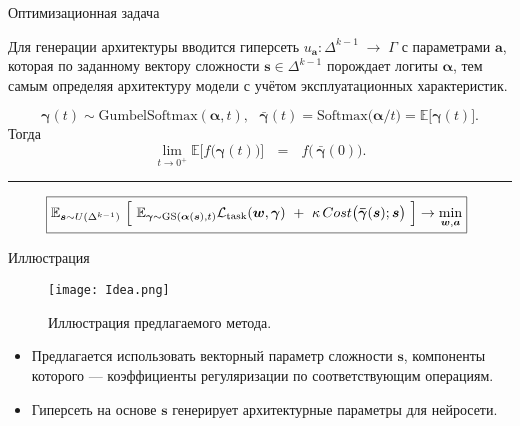 \documentclass{beamer}
\begin{document}

\begin{frame}{Оптимизационная задача}

Для генерации архитектуры вводится гиперсеть
$u_{\boldsymbol a}\colon \Delta^{k-1} \;\rightarrow\; \Gamma$  с параметрами $\boldsymbol a$, которая по заданному вектору сложности $\boldsymbol{s}\in\Delta^{k-1}$ порождает логиты
$\boldsymbol{\alpha}$, тем самым определяя архитектуру модели с учётом эксплуатационных характеристик.

\begin{theorem}[Фирсов, 2025] \label{th:gs_softmax}
\vspace{-20pt}
$$\boldsymbol\gamma(t)\sim\mathrm{GumbelSoftmax}(\boldsymbol\alpha,t),
   \ \ \ 
   \boldsymbol{\bar\gamma}(t)=\mathrm{Softmax}\!\bigl(\boldsymbol\alpha/t\bigr)
               =\mathbb E\bigl[\boldsymbol\gamma(t)\bigr].$$
Тогда
$$\lim_{t\to 0^{+}}
       \mathbb E\bigl[f\bigl(\boldsymbol\gamma(t)\bigr)\bigr]
   \ \ \ = \ \ \ 
   f\!\bigl(\,\boldsymbol{\bar\gamma}(0)\bigr).$$
\end{theorem}

\rule[0pt]{310pt}{0.5pt} %
\vspace{-5pt}
$$ \hspace{-5pt}\boxed{\mathbb E_{\boldsymbol s\sim U(\Delta^{k-1})} \ \Bigl[ \ {\mathbb E_{\boldsymbol\gamma\sim\mathrm{GS}(\boldsymbol\alpha(\boldsymbol s),t)} \mathcal L_{\text{task}}(\boldsymbol w,\boldsymbol\gamma)} \ +\  \kappa\,Cost\bigl(\boldsymbol{\bar\gamma}(\boldsymbol s);\boldsymbol s\bigr) \ \Bigr] \rightarrow \min_{\boldsymbol w,\boldsymbol a}}  
$$


\end{frame}


\begin{frame}{Иллюстрация}

\begin{figure}
        \centering
        \texttt{[image: Idea.png]}
        \caption{Иллюстрация предлагаемого метода.}
       
\end{figure}

\begin{itemize}
    \item Предлагается использовать векторный параметр сложности $\boldsymbol{s}$, компоненты которого --- коэффициенты регуляризации по соответствующим операциям.
    \item Гиперсеть на основе $\boldsymbol{s}$ генерирует архитектурные параметры для нейросети.
\end{itemize}

\end{frame}
\end{document}
